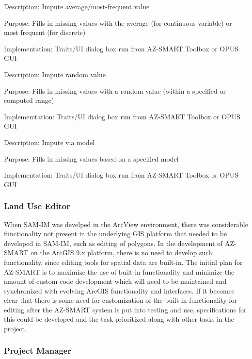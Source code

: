 Description: Impute average/most-frequent value

Purpose: Fills in missing values with the average (for continuous variable) or most frequent (for discrete)

Implementation: Traits/UI dialog box run from AZ-SMART Toolbox or OPUS GUI

\bigskip

Description: Impute random value

Purpose: Fills in missing values with a random value (within a specified or computed range)

Implememtation: Traits/UI dialog box run from AZ-SMART Toolbox or OPUS GUI

\bigskip

Description: Impute via model

Purpose: Fills in missing values based on a specified model

Implementation: Traits/UI dialog box run from AZ-SMART Toolbox or OPUS GUI

\bigskip

\subsubsection{Land Use Editor}
When SAM-IM was develped in the ArcView environment, there was considerable functionality not present in the underlying GIS platform that needed to be developed in SAM-IM, such as editing of polygons.  In the development of AZ-SMART on the ArcGIS 9.x platform, there is no need to develop such functionality, since editing tools for spatial data are built-in.  The initial plan for AZ-SMART is to maximize the use of built-in functionality and minimize the amount of custom-code development which will need to be maintained and synchronized with evolving ArcGIS functionality and interfaces.  If it becomes clear that there is some need for customization of the built-in functionality for editing after the AZ-SMART system is put into testing and use, specifications for this could be developed and the task prioritized along with other tasks in the project.


\subsubsection{Project Manager}

